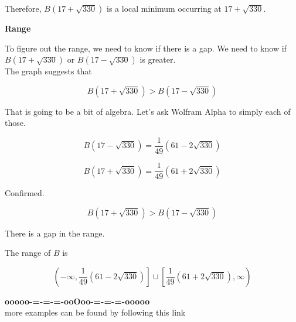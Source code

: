\documentclass{ximera}
\begin{document}
\begin{example}
Therefore, $B(17 + \sqrt{330})$ is a local minimum occurring at $17 + \sqrt{330}$.









\textbf{Range}


To figure out the range, we need to know if there is a gap.  We need to know if $B(17 + \sqrt{330})$ or $B(17 - \sqrt{330})$ is greater. \\

The graph suggests that 

\[
B(17 + \sqrt{330})  > B(17 - \sqrt{330})
\]


That is going to be a bit of algebra. Let's ask Wolfram Alpha to simply each of those.



\[
B(17 - \sqrt{330}) = \frac{1}{49} (61 - 2 \sqrt{330})
\]




\[
B(17 + \sqrt{330})  =  \frac{1}{49} (61 + 2 \sqrt{330})
\]


Confirmed.


\[
B(17 + \sqrt{330})  > B(17 - \sqrt{330})
\]


There is a gap in the range.


The range of $B$ is 


\[
\left( -\infty, \frac{1}{49} (61 - 2 \sqrt{330}) \right] \cup  \left[ \frac{1}{49} (61 + 2 \sqrt{330}), \infty \right) 
\]





\end{example}














\begin{center}
\textbf{\textcolor{green!50!black}{ooooo-=-=-=-ooOoo-=-=-=-ooooo}} \\

more examples can be found by following this link\\ 

\end{center}
\end{document}
